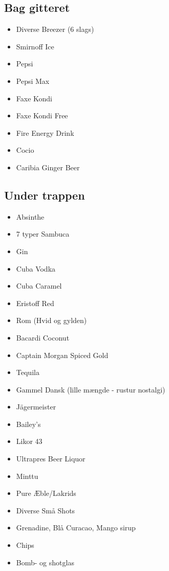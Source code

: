 \subsection{Bag gitteret}

\begin{itemize}
    \item Diverse Breezer (6 slags)
    \item Smirnoff Ice 
    \item Pepsi 
    \item Pepsi Max
    \item Faxe Kondi
    \item Faxe Kondi Free
    \item Fire Energy Drink
    \item Cocio
    \item Caribia Ginger Beer
\end{itemize}

\subsection{Under trappen}

\begin{itemize}
    \item Absinthe
    \item 7 typer Sambuca
    \item Gin 
    \item Cuba Vodka 
    \item Cuba Caramel  
    \item Eristoff Red
    \item Rom (Hvid og gylden)
    \item Bacardi Coconut
    \item Captain Morgan Spiced Gold
    \item Tequila
    \item Gammel Dansk (lille mængde - rustur nostalgi)
    \item Jägermeister
    \item Bailey's
    \item Likor 43
    \item Ultrapres Beer Liquor 
    \item Minttu
    \item Pure Æble/Lakrids
    \item Diverse Små Shots
    \item Grenadine, Blå Curacao, Mango sirup
    \item Chips
    \item Bomb- og shotglas
\end{itemize}

